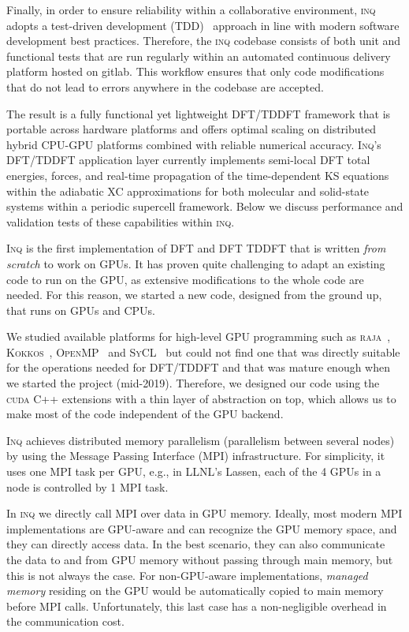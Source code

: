Finally, in order to ensure reliability within a collaborative environment, \textsc{inq} adopts a test-driven development (TDD)~\cite{Beck2002} approach in line with modern software development best practices. 
Therefore, the \textsc{inq} codebase consists of both unit and functional tests that are run regularly within an automated continuous delivery platform hosted on gitlab. This workflow ensures that only code modifications that do not lead to errors anywhere in the codebase are accepted.

The result is a fully functional yet lightweight DFT/TDDFT framework that is portable across hardware platforms and offers optimal scaling on distributed hybrid CPU-GPU platforms combined with reliable numerical accuracy. 
\textsc{Inq}'s DFT/TDDFT application layer currently implements semi-local DFT total energies, forces, and real-time propagation of the time-dependent KS equations within the adiabatic XC approximations for both molecular and solid-state systems within a periodic supercell framework. 
Below we discuss performance and validation tests of these capabilities within \textsc{inq}. 

 \textsc{Inq} is the first implementation of DFT and DFT TDDFT that is written \emph{from scratch} to work on GPUs.
It has proven quite challenging to adapt an existing code to run on the GPU, as extensive modifications to the whole code are needed.
For this reason, we started a new code, designed from the ground up, that runs on GPUs and CPUs. 

We studied available platforms for high-level GPU programming such as \textsc{raja}~\cite{Beckingsale2019}, \textsc{Kokkos}~\cite{CarterEdwards2014}, \textsc{OpenMP}~\cite{Lee2010} and \textsc{SyCL}~\cite{Alpay2020} but could not find one that was directly suitable for the operations needed for DFT/TDDFT and that was mature enough when we started the project (mid-2019).
Therefore, we designed our code using the \textsc{cuda} C++ extensions with a thin layer of abstraction on top, which allows us to make most of the code independent of the GPU backend.

\textsc{Inq} achieves distributed memory parallelism (parallelism between several nodes) by using the Message Passing Interface (\textsc{MPI}) infrastructure.
For simplicity, it uses one MPI task per GPU, e.g., in LLNL's Lassen, each of the 4 GPUs in a node is controlled by 1 MPI task.

In \textsc{inq} we directly call \textsc{MPI} over data in GPU memory.
Ideally, most modern \textsc{MPI} implementations are GPU-aware and can recognize the GPU memory space, and they can directly access data.
In the best scenario, they can also communicate the data to and from GPU memory without passing through main memory, but this is not always the case.
For non-GPU-aware implementations, \emph{managed memory} residing on the GPU would be automatically copied to main memory before \textsc{MPI} calls.
Unfortunately, this last case has a non-negligible overhead in the communication cost.

